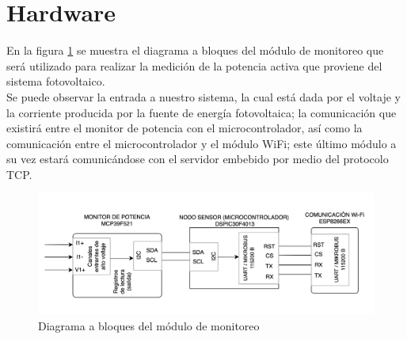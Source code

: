 \section{Hardware}
En la figura \ref{fig:circuito} se muestra el diagrama a bloques del módulo de monitoreo que será utilizado para realizar la medición de la potencia activa que proviene del sistema fotovoltaico. \\
Se puede observar la entrada a nuestro sistema, la cual está dada por el voltaje y la corriente producida por la fuente de energía fotovoltaica; la comunicación que existirá entre el monitor de potencia con el microcontrolador, así como la comunicación entre el microcontrolador y el módulo WiFi; este último módulo a su vez estará comunicándose con el servidor embebido por medio del protocolo TCP.  
\\
\begin{figure}[H]
	\centering
	\includegraphics[width=1\textwidth]{Capitulo4/hardware/images/sistemaDigital.png}
	\caption{Diagrama a bloques del módulo de monitoreo}
	\label{fig:circuito}
\end{figure}

%